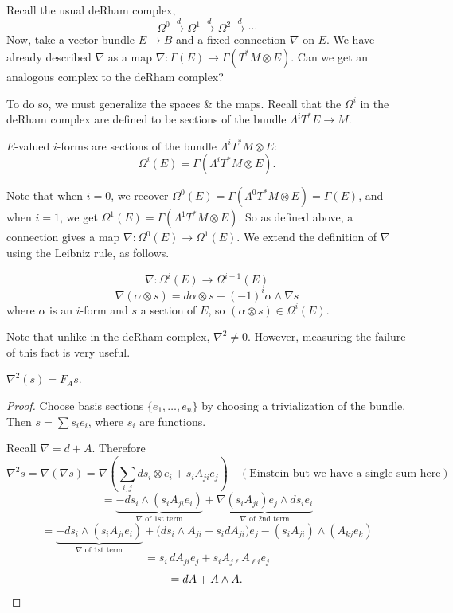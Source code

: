 \documentclass[main]{subfiles}
\begin{document}
Recall the usual deRham complex,
\[
\Omega^0 \xrightarrow{d} \Omega^1 \xrightarrow{d} \Omega^2 \xrightarrow{d} \cdots
\]
Now, take a vector bundle $E\to B$ and a fixed connection $\nabla$ on $E$. We have already described $\nabla$ as a map $\nabla : \Gamma(E) \to \Gamma(T^\ast M\otimes E)$. Can we get an analogous complex to the deRham complex?

To do so, we must generalize the spaces \& the maps. Recall that the $\Omega^i$ in the deRham complex are defined to be sections of the bundle $\Lambda^i T^\ast E \to M$.

\begin{definition}
$E$-valued $i$-forms are sections of the bundle $\Lambda^i T^\ast M\otimes E$:
\[
\Omega^i(E) = \Gamma(\Lambda^i T^\ast M \otimes E).
\]
\end{definition}

Note that when $i=0$, we recover $\Omega^0(E) = \Gamma(\Lambda^0 T^\ast M\otimes E) = \Gamma(E)$, and when $i=1$, we get $\Omega^1(E) = \Gamma(\Lambda^1 T^\ast M\otimes E)$. So as defined above, a connection gives a map $\nabla : \Omega^0(E) \to \Omega^1(E)$. We extend the definition of $\nabla$ using the Leibniz rule, as follows.

\begin{definition}
\[
\nabla : \Omega^i(E) \to \Omega^{i+1}(E)
\]
\[
\nabla(\alpha\otimes s) = d\alpha\otimes s + (-1)^i \alpha\wedge\nabla s
\]
where $\alpha$ is an $i$-form and $s$ a section of $E$, so $(\alpha\otimes s)\in\Omega^i(E)$.
\end{definition}

Note that unlike in the deRham complex, $\nabla^2\neq 0$. However, measuring the failure of this fact is very useful.

\begin{lemma}
$\nabla^2(s) = F_A s$.
\end{lemma}

\begin{proof}
Choose basis sections $\{e_1,\ldots,e_n\}$ by choosing a trivialization of the bundle. Then $s = \sum s_i e_i$, where $s_i$ are functions.

Recall $\nabla = d+A$. Therefore
\[
\nabla^2 s = \nabla(\nabla s) = \nabla\left(\sum_{i,j} ds_i\otimes e_i + s_iA_{ji}e_j\right) \quad (\text{Einstein but we have a single sum here})
\]
\[
= \underbrace{-ds_i\wedge(s_iA_{ji}e_i)}_{\nabla \text{ of 1st term}} + \underbrace{\nabla(s_iA_{ji})e_j\wedge ds_ie_i}_{\nabla \text{ of 2nd term}}
\]
\[
= \underbrace{-ds_i\wedge(s_iA_{ji}e_i)}_{\nabla \text{ of 1st term}} + \big(ds_i\wedge A_{ji}+s_idA_{ji}\big)e_j - (s_iA_{ji})\wedge(A_{kj}e_k)
\]
\[
= s_i\,dA_{ji}e_j + s_iA_{j\ell}A_{\ell i}e_j
\]
\[
= dA + A\wedge A. \qedhere
\]
\end{proof}
\end{document}
